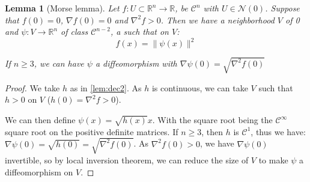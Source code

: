 \documentclass[10pt,a4paper]{report}
\theoremstyle{plain}
\newtheorem{lem}[thm]{Lemma}
\theoremstyle{definition}
\theoremstyle{remark}
\newcommand{\R}{\ensuremath{\mathbb{R}}}
\renewcommand{\geq}{\geqslant}
\newcommand{\class}[1]{{\mathscr{C}^{#1}}}
\begin{document}
\begin{lem}[Morse lemma]\label{lem:morse}
  Let $f : U \subset \R^n \to \R$, be $\class{n}$ with $U \in \mathcal{N}(0)$.
  Suppose that $f(0) = 0$, $\nabla f(0) = 0$ and $\nabla^2 f > 0$.
  Then we have a neighborhood $V$ of 0 and $\psi : V \to \R^n$ of class
  $\class{n-2}$, a such that on $V$:
  \[f(x) = \|\psi(x)\|^2\]

  If $n \geq 3$, we can have $\psi$ a diffeomorphism with $\nabla \psi(0) = \sqrt{\nabla^2 f(0)}$
\end{lem}

\begin{proof}
  We take $h$ as in \cref{lem:dec2}. As $h$ is continuous, we can take $V$ such
  that $h > 0$ on $V$ ($h(0) = \nabla^2 f > 0$).

  We can then define $\psi(x) = \sqrt{h(x)} x$. With the square root being the
  $\class{\infty}$ square root on the positive definite matrices.
  If $n \geq 3$, then $h$ is $\class 1$, thus we have: $\nabla \psi(0) =
  \sqrt{h(0)} = \sqrt{\nabla^2 f(0)}$. As $\nabla^2
  f(0) > 0$, we have $\nabla \psi(0)$ invertible, so by local inversion theorem,
  we can reduce the size of $V$ to make $\psi$ a diffeomorphism on $V$.

\end{proof}




\end{document}
